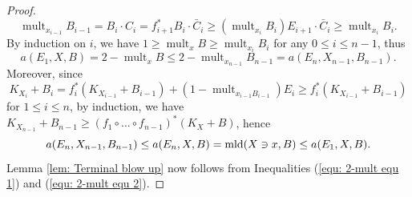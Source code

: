\documentclass[11pt]{amsart}
\numberwithin{equation}{section}
\newcommand{\Qq}{\mathbb{Q}}
\newcommand{\mld}{{\rm{mld}}}
\newcommand{\Supp}{\operatorname{Supp}}
\newcommand{\mult}{\operatorname{mult}}
\newtheorem{thm}{Theorem}[section]
\theoremstyle{definition}
\theoremstyle{definition}
\begin{document}
\begin{proof}
$$\mult_{x_{i-1}} B_{i-1}=B_{i}\cdot C_i= f_{i+1}^*B_{i}\cdot\bar C_{i}\geq (\mult_{x_i}B_{i})E_{i+1}\cdot\bar C_{i} \geq  \mult_{x_i}B_{i}.$$
By induction on $i$, we have $1\geq \mult_{x} B\geq \mult_{x_{i}} B_{i}$ for any $0\leq i\leq n-1$, thus
\begin{equation}\label{equ: 2-mult equ 1}
    a(E_1,X,B)=2-\mult_xB\leq 2-\mult_{x_{n-1}}B_{n-1}=a(E_n,X_{n-1},B_{n-1}).
\end{equation}
Moreover, since
$$K_{X_i}+B_i=f_i^*(K_{X_{i-1}}+B_{i-1})+(1-\mult_{x_{i-1}B_{i-1}})E_i\geq f_i^*(K_{X_{i-1}}+B_{i-1})$$ for $1\leq i\leq n$,
by induction, we have $K_{X_{n-1}}+B_{n-1}\geq (f_{1}\circ\dots\circ f_{n-1})^*(K_X+B)$, hence
\begin{equation}\label{equ: 2-mult equ 2}
a(E_n,X_{n-1},B_{n-1})\leq a(E_n,X,B)=\mld(X\ni x,B)\leq a(E_1,X,B).
\end{equation}
Lemma \ref{lem: Terminal blow up} now follows from Inequalities (\ref{equ: 2-mult equ 1}) and (\ref{equ: 2-mult equ 2}).
\end{proof}

\end{document}
